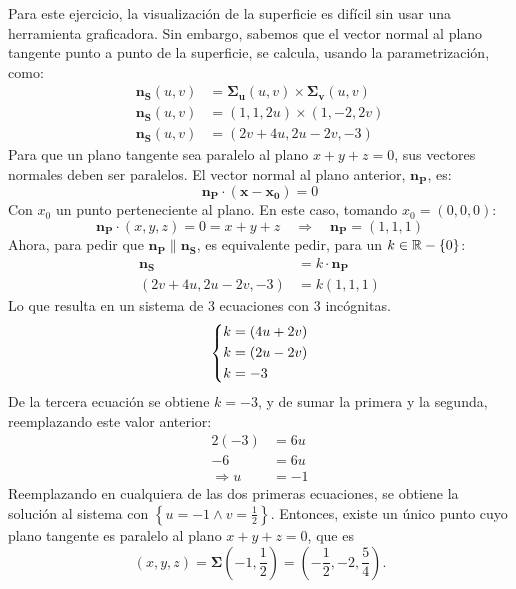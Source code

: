 \begin{solution}
Para este ejercicio, la visualización de la superficie es difícil sin usar una herramienta graficadora.
Sin embargo, sabemos que el vector normal al plano tangente punto a punto de la superficie, se calcula, usando la parametrización, como:
\begin{align*}
    \boldsymbol{n_S}(u,v)&=\boldsymbol{\Sigma_{u}}(u,v)\times \boldsymbol{\Sigma_{v}}(u,v)\\
    \boldsymbol{n_S}(u,v)&=(1,1,2u)\times(1,-2,2v)\\
    \boldsymbol{n_S}(u,v)&=(2v+4u,2u-2v,-3)
\end{align*}
Para que un plano tangente sea paralelo al plano $x+y+z=0$, sus vectores normales deben ser paralelos. El vector normal al plano anterior, $\boldsymbol{n_{P}}$, es:
\begin{equation*}
    \boldsymbol{n_{P}}\cdot \left(\boldsymbol{x}-\boldsymbol{x_{0}}\right) = 0
\end{equation*}
Con $x_0$ un punto perteneciente al plano. En este caso, tomando $x_0=(0,0,0)$:
\begin{equation*}
    \boldsymbol{n_{P}}\cdot (x,y,z) = 0 = x+y+z \quad \Rightarrow \quad \boldsymbol{n_{P}}=(1,1,1)
\end{equation*}
Ahora, para pedir que $\boldsymbol{n_{P}} \parallel \boldsymbol{n_{S}}$, es equivalente pedir, para un $k\in\mathbb{R}-\{0\}$:
\begin{align*}
    \boldsymbol{n_{S}} &= k \cdot \boldsymbol{n_{P}}\\
    (2v+4u,2u-2v,-3)&= k(1,1,1)
\end{align*}
Lo que resulta en un sistema de 3 ecuaciones con 3 incógnitas.
\[\begin{dcases}
            k = (4u+2v) \\
            k = (2u-2v)         \\
            k = -3
        \end{dcases}\]
De la tercera ecuación se obtiene $k=-3$, y de sumar la primera y la segunda, reemplazando este valor anterior:
\begin{align*}
    2(-3)&=6u\\
    -6&=6u\\
    \Rightarrow u&=-1
\end{align*}
Reemplazando en cualquiera de las dos primeras ecuaciones, se obtiene la solución al sistema con $\left\{u=-1 \land v=\frac{1}{2}\right\}$. 
Entonces, existe un único punto cuyo plano tangente es paralelo al plano $x+y+z=0$, que es 
\begin{equation*}
    (x,y,z)=\boldsymbol{\Sigma}\left(-1,\frac{1}{2}\right)=\left(-\frac{1}{2},-2,\frac{5}{4}\right).    
\end{equation*}


\end{solution}
